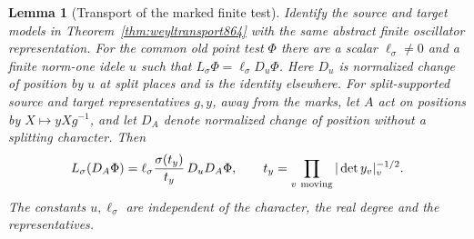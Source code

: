 \documentclass[a4paper,11pt]{article}
\newtheorem{lemma}[proposition]{Lemma}
\theoremstyle{definition}
\theoremstyle{remark}
\numberwithin{equation}{section}
\begin{document}
\begin{lemma}[Transport of the marked finite test]
\leavevmode\label{lem:markedconj865}
Identify the source and target models in
Theorem~\ref{thm:weyltransport864} with the same abstract finite
oscillator representation. For the common old point test \(\Phi\)
there are a scalar \(\ell_\sigma\ne0\) and a finite norm-one
idele \(u\) such that \(L_\sigma\Phi=\ell_\sigma D_u\Phi\).
Here \(D_u\) is normalized change of position by \(u\) at
split places and is the identity elsewhere. For split-supported
source and target representatives \(g,y\), away from the marks,
let \(A\) act on positions by \(X\mapsto yXg^{-1}\), and let
\(D_A\) denote normalized change of position without a splitting
character. Then
\begin{equation}
 L_\sigma(D_A\Phi)
     =\ell_\sigma
       \frac{\sigma(t_y)}{t_y}\,D_uD_A\Phi,\qquad
 t_y=\prod_{v\ {\rm moving}}|\det y_v|_v^{-1/2}.
 \label{eq:splittransport865}
\end{equation}
The constants \(u,\ell_\sigma\) are independent of the character,
the real degree and the representatives.
\end{lemma}
\end{document}
